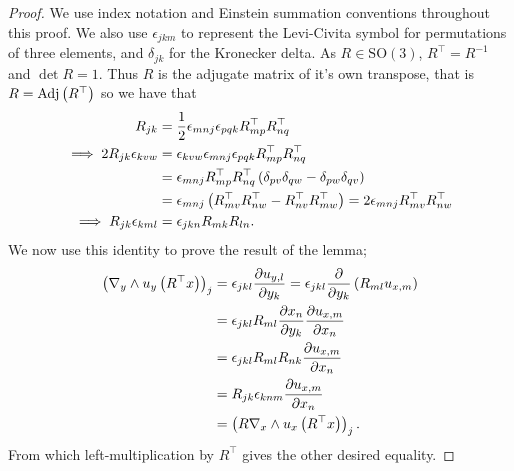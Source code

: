 \begin{proof}
	We use index notation and Einstein summation conventions throughout this proof.
	We also use $\epsilon_{jkm}$ to represent the Levi-Civita symbol for permutations of three elements, and $\delta_{jk}$ for the Kronecker delta.
	As $R\in\mathrm{SO}(3)$, $R^\top=R^{-1}$ and $\det R = 1$.
	Thus $R$ is the adjugate matrix of it's own transpose, that is $R = \mathrm{Adj}\left( R^\top \right)$ so we have that
	\begin{align*}
		R_{jk} &= \frac{1}{2}\epsilon_{mnj}\epsilon_{pqk}R^\top_{mp}R^\top_{nq} \\
		\implies 2R_{jk}\epsilon_{kvw} &= \epsilon_{kvw}\epsilon_{mnj}\epsilon_{pqk}R^\top_{mp}R^\top_{nq} \\
		&= \epsilon_{mnj}R^\top_{mp}R^\top_{nq}\left( \delta_{pv}\delta_{qw} - \delta_{pw}\delta_{qv} \right) \\
		&= \epsilon_{mnj}\left( R^\top_{mv}R^\top_{nw} - R^\top_{nv}R^\top_{mw} \right)
		= 2\epsilon_{mnj}R^\top_{mv}R^\top_{nw} \\
		\implies R_{jk}\epsilon_{kml} &= \epsilon_{jkn}R_{mk}R_{ln}.
	\end{align*}
	We now use this identity to prove the result of the lemma;
	\begin{align*}
		\left( \nabla_y\wedge u_y\left( R^\top x \right) \right)_j &= \epsilon_{jkl}\dfrac{\partial u_{y,l}}{\partial y_k}
		= \epsilon_{jkl}\dfrac{\partial }{\partial y_k}\left( R_{ml}u_{x,m} \right) \\
		&= \epsilon_{jkl}R_{ml}\dfrac{\partial x_n}{\partial y_k}\dfrac{\partial u_{x,m}}{\partial x_n} \\
		&= \epsilon_{jkl}R_{ml}R_{nk}\dfrac{\partial u_{x,m}}{\partial x_n} \\
		&= R_{jk}\epsilon_{knm}\dfrac{\partial u_{x,m}}{\partial x_n} \\
		&= \left(  R\nabla_x\wedge u_x\left( R^\top x \right)  \right)_j.
	\end{align*}
	From which left-multiplication by $R^\top$ gives the other desired equality.
\end{proof}

